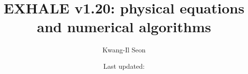 \documentclass[english,a4paper]{my_memo}
\begin{document}
\title{EXHALE v1.20: physical equations and numerical algorithms}
\author{Kwang-Il Seon}
\date{Last updated: \docmoddate}
\maketitle

\tableofcontents
\bigskip













\end{document}
